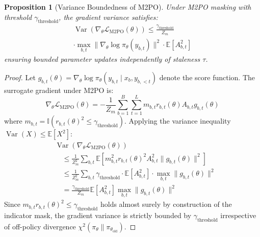 \documentclass[10pt,twocolumn,letterpaper]{article}
\newtheorem{proposition}[theorem]{Proposition}
\begin{document}
\begin{proposition}[Variance Boundedness of M2PO]
Under M2PO masking with threshold $\gamma_{\text{threshold}}$, the gradient variance satisfies:
\begin{equation}
\begin{split}
    \operatorname{Var}\left( \nabla_\theta \mathcal{L}_{\text{M2PO}}(\theta) \right) \le \frac{\gamma_{\text{threshold}}}{Z_m} \\
    \cdot \max_{b,t} \| \nabla_\theta \log \pi_\theta(y_{b,t}) \|^2 \cdot \mathbb{E}[A_{b,t}^2]
\end{split}
\end{equation}
ensuring bounded parameter updates independently of staleness $\tau$.
\end{proposition}

\begin{proof}
Let $g_{b,t}(\theta) = \nabla_\theta \log \pi_\theta(y_{b,t} \mid x_b, y_{b,<t})$ denote the score function. The surrogate gradient under M2PO is:
\begin{equation*}
    \nabla_\theta \mathcal{L}_{\text{M2PO}}(\theta) = -\frac{1}{Z_m} \sum_{b=1}^B \sum_{t=1}^L m_{b,t} r_{b,t}(\theta) A_{b,t} g_{b,t}(\theta)
\end{equation*}
where $m_{b,t} = \mathbb{I}(r_{b,t}(\theta)^2 \le \gamma_{\text{threshold}})$. Applying the variance inequality $\operatorname{Var}(X) \le \mathbb{E}[X^2]$:
\begin{equation*}
\begin{split}
    &\operatorname{Var}\left( \nabla_\theta \mathcal{L}_{\text{M2PO}}(\theta) \right) \\
    &\quad \le \frac{1}{Z_m^2} \sum_{b,t} \mathbb{E}\left[ m_{b,t}^2 r_{b,t}(\theta)^2 A_{b,t}^2 \| g_{b,t}(\theta) \|^2 \right] \\
    &\quad \le \frac{1}{Z_m^2} \sum_{b,t} \gamma_{\text{threshold}} \cdot \mathbb{E}[A_{b,t}^2] \cdot \max_{b,t} \| g_{b,t}(\theta) \|^2 \\
    &\quad = \frac{\gamma_{\text{threshold}}}{Z_m} \mathbb{E}[A_{b,t}^2] \max_{b,t} \| g_{b,t}(\theta) \|^2
\end{split}
\end{equation*}
Since $m_{b,t} r_{b,t}(\theta)^2 \le \gamma_{\text{threshold}}$ holds almost surely by construction of the indicator mask, the gradient variance is strictly bounded by $\gamma_{\text{threshold}}$ irrespective of off-policy divergence $\chi^2(\pi_\theta \parallel \pi_{\theta_{\text{old}}})$.
\end{proof}
\end{document}
